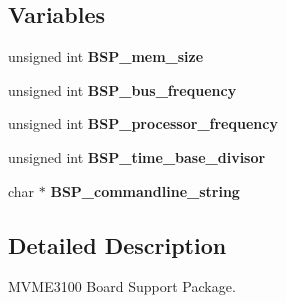 \subsection*{Variables}
\begin{DoxyCompactItemize}
\item 
\mbox{\label{group__RTEMSBSPsPowerPCMVME3100_ga8c4c5c7af3d465fe0600af1ce23505ba}} 
unsigned int {\bfseries B\+S\+P\+\_\+mem\+\_\+size}
\item 
\mbox{\label{group__RTEMSBSPsPowerPCMVME3100_gacebd8212ca7912c89b531e7abaeb8389}} 
unsigned int {\bfseries B\+S\+P\+\_\+bus\+\_\+frequency}
\item 
\mbox{\label{group__RTEMSBSPsPowerPCMVME3100_ga7a8f6379809948b0b0027d0a7b37755f}} 
unsigned int {\bfseries B\+S\+P\+\_\+processor\+\_\+frequency}
\item 
\mbox{\label{group__RTEMSBSPsPowerPCMVME3100_ga98a2dadc74a0a129fcdb66f5e97e01c5}} 
unsigned int {\bfseries B\+S\+P\+\_\+time\+\_\+base\+\_\+divisor}
\item 
\mbox{\label{group__RTEMSBSPsPowerPCMVME3100_ga100176343d992cefc1dda54c21c9abc3}} 
char $\ast$ {\bfseries B\+S\+P\+\_\+commandline\+\_\+string}
\end{DoxyCompactItemize}


\subsection{Detailed Description}
M\+V\+M\+E3100 Board Support Package. 

